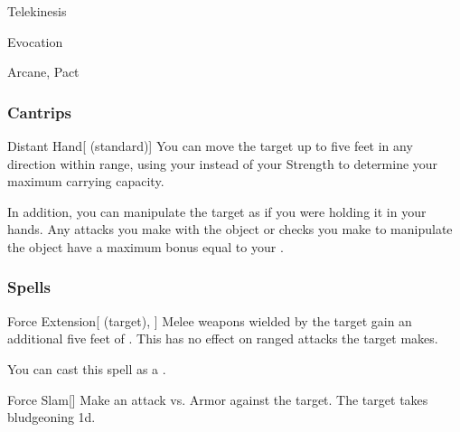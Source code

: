 \newpage
\begin{spellsection}{Telekinesis}

\begin{spellheader}
\end{spellheader}


 Evocation

 Arcane, Pact

\subsubsection{Cantrips}


\begin{freeability}{Distant Hand}[ (standard)]
You can move the target up to five feet in any direction within range, using your  instead of your Strength to determine your maximum carrying capacity.

In addition, you can manipulate the target as if you were holding it in your hands.
Any attacks you make with the object or checks you make to manipulate the object have a maximum bonus equal to your .
\end{freeability}

\end{spellsection}


\subsubsection{Spells}


\lowercase{\hypertarget{spell:Force Extension}{}}\label{spell:Force Extension}
\begin{attuneability}[Rank 1]{\hypertarget{spell:Force Extension}{Force Extension}}[ (target), ]
Melee weapons wielded by the target gain an additional five feet of .
This has no effect on ranged attacks the target makes.

You can cast this spell as a .
\end{attuneability}
\vspace{0.25em}



\lowercase{\hypertarget{spell:Force Slam}{}}\label{spell:Force Slam}
\begin{freeability}[Rank 1]{\hypertarget{spell:Force Slam}{Force Slam}}[]
Make an attack vs. Armor against the target.
\hit The target takes bludgeoning  \plus1d.
\end{freeability}
\vspace{0.25em}



